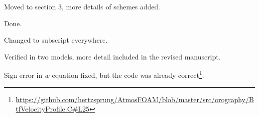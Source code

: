 \documentclass{article}
\begin{document}
\begin{quotation}
\begin{comment}
\item Line 211: The information about different numerical schemes is very sudden here without enough information.  Add a description and references for all numerical options in section 2.
\end{comment}
\end{quotation}
Moved to section 3, more details of schemes added.

\begin{quotation}
\begin{comment}
\item Line 223: typo: artifact
\end{comment}
\end{quotation}
Done.

\begin{quotation}
\begin{comment}
\item Eq. 14: It is highly unusual to use a superscript (instead of a subscript) for the error norm
\end{comment}
\end{quotation}
Changed to subscript everywhere.

\begin{quotation}
\begin{comment}
\item Line 247: The result that the increase of the model domain from 300 to 301km leads to a 50\% increase in the $\ell_2$ error seems to be highly questionable.  This needs to be double-checked and explained in greater detail.
\end{comment}
\end{quotation}
Verified in two models, more detail included in the revised manuscript.

\begin{quotation}
\begin{comment}
\item Eq. (16): see comment 19 concerning the different sign conventions and unify the presentation.  In addition, the formulation for $w$ is wrong and has a sign error.  The vertical velocity $w$ needs to be multiplied with ($-1$) to correct it in its current form.  In case you used the wrong formulation for the results, they all need to be rerun.
\end{comment}
\end{quotation}
Sign error in $w$ equation fixed, but the code was already correct\footnote{\url{https://github.com/hertzsprung/AtmosFOAM/blob/master/src/orography/BtfVelocityProfile.C#L25}}.
\end{document}
